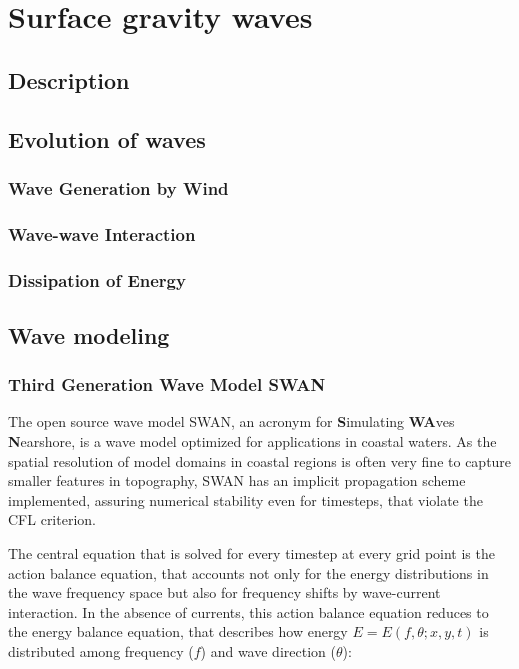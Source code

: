 \chapter{Surface gravity waves}
\label{kap-waves}

\section{Description}

\section{Evolution of waves}

\subsection{Wave Generation by Wind}



\subsection{Wave-wave Interaction}

\subsection{Dissipation of Energy}

\section{Wave modeling}

\subsection{Third Generation Wave Model SWAN}

The open source wave model SWAN, an acronym for \textbf{S}imulating \textbf{WA}ves \textbf{N}earshore, is a wave model optimized for applications in coastal waters. As the spatial resolution of model domains in coastal regions is often very fine to capture smaller features in topography, SWAN has an implicit propagation scheme implemented, assuring numerical stability even for timesteps, that violate the CFL criterion. 

The central equation that is solved for every timestep at every grid point is the action balance equation, that accounts not only for the energy distributions in the wave frequency space but also for frequency shifts by wave-current interaction. In the absence of currents, this action balance equation reduces to the energy balance equation, that describes how energy $E=E(f, \theta; x,y,t)$ is distributed among frequency ($f$) and wave direction ($\theta$):

